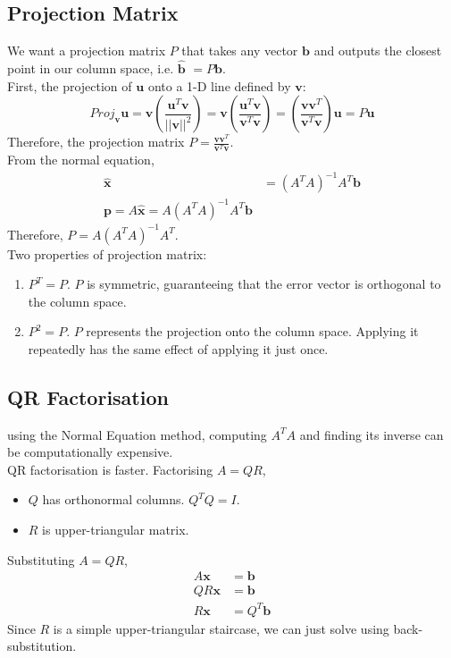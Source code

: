 \documentclass[../linear-algebra.tex]{subfiles}
\begin{document}
\subsection{Projection Matrix}
We want a projection matrix $P$ that takes any vector $\mathbf{b}$ and outputs the closest point in our column space, i.e. $\mathbf{\hat{b}}$ $= P$$\mathbf{b}$.\\
First, the projection of $\mathbf{u}$ onto a 1-D line defined by $\mathbf{v}$:
$$Proj_{\mathbf{v}}\mathbf{u} = \mathbf{v}\left(\frac{\mathbf{u}^T\mathbf{v}}{||\mathbf{v}||^2}\right) = \mathbf{v}\left(\frac{\mathbf{u}^T\mathbf{v}}{\mathbf{v}^T\mathbf{v}}\right) = \left(\frac{\mathbf{v}\mathbf{v}^T}{\mathbf{v}^T\mathbf{v}}\right)\mathbf{u} = P\mathbf{u}$$
Therefore, the projection matrix $P = \frac{\mathbf{v}\mathbf{v}^T}{\mathbf{v}^T\mathbf{v}}$.\\
From the normal equation,
\begin{align*}
    \mathbf{\hat{x}} &= (A^TA)^{-1}A^T\mathbf{b}\\
    \mathbf{p} = A\mathbf{\hat{x}} = A(A^TA)^{-1}A^T\mathbf{b}
\end{align*}
Therefore, $P = A(A^TA)^{-1}A^T$.\\
Two properties of projection matrix:
\begin{enumerate}
    \item $P^T = P$. $P$ is symmetric, guaranteeing that the error vector is orthogonal to the column space.
    \item $P^2 = P$. $P$ represents the projection onto the column space. Applying it repeatedly has the same effect of applying it just once.
\end{enumerate}

\subsection{QR Factorisation}
using the Normal Equation method, computing $A^T A$ and finding its inverse can be computationally expensive.\\
QR factorisation is faster. Factorising $A=QR$,
\begin{itemize}
    \item $Q$ has orthonormal columns. $Q^T Q = I$.
    \item $R$ is upper-triangular matrix.
\end{itemize}
Substituting $A=QR$,
\begin{align*}
    A\mathbf{x} &= \mathbf{b} \\
    QR\mathbf{x} &= \mathbf{b} \\
    R\mathbf{x} &= Q^T \mathbf{b}
\end{align*}
Since $R$ is a simple upper-triangular staircase, we can just solve using back-substitution.
\end{document}
